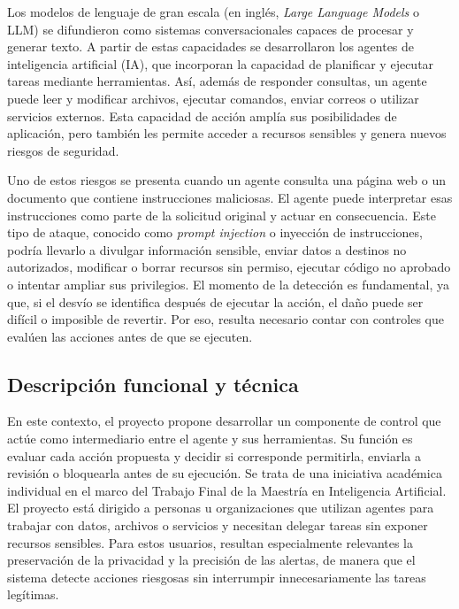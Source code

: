 \documentclass[
11pt, %
]{charter}
\begin{document}
Los modelos de lenguaje de gran escala (en inglés, \textit{Large Language Models} o LLM) se difundieron como sistemas conversacionales capaces de procesar y generar texto. A partir de estas capacidades se desarrollaron los agentes de inteligencia artificial (IA), que incorporan la capacidad de planificar y ejecutar tareas mediante herramientas. Así, además de responder consultas, un agente puede leer y modificar archivos, ejecutar comandos, enviar correos o utilizar servicios externos. Esta capacidad de acción amplía sus posibilidades de aplicación, pero también les permite acceder a recursos sensibles y genera nuevos riesgos de seguridad.

Uno de estos riesgos se presenta cuando un agente consulta una página web o un documento que contiene instrucciones maliciosas. El agente puede interpretar esas instrucciones como parte de la solicitud original y actuar en consecuencia. Este tipo de ataque, conocido como \textit{prompt injection} o inyección de instrucciones, podría llevarlo a divulgar información sensible, enviar datos a destinos no autorizados, modificar o borrar recursos sin permiso, ejecutar código no aprobado o intentar ampliar sus privilegios. El momento de la detección es fundamental, ya que, si el desvío se identifica después de ejecutar la acción, el daño puede ser difícil o imposible de revertir. Por eso, resulta necesario contar con controles que evalúen las acciones antes de que se ejecuten.

\subsection{Descripción funcional y técnica}

En este contexto, el proyecto propone desarrollar un componente de control que actúe como intermediario entre el agente y sus herramientas. Su función es evaluar cada acción propuesta y decidir si corresponde permitirla, enviarla a revisión o bloquearla antes de su ejecución. Se trata de una iniciativa académica individual en el marco del Trabajo Final de la Maestría en Inteligencia Artificial. El proyecto está dirigido a personas u organizaciones que utilizan agentes para trabajar con datos, archivos o servicios y necesitan delegar tareas sin exponer recursos sensibles. Para estos usuarios, resultan especialmente relevantes la preservación de la privacidad y la precisión de las alertas, de manera que el sistema detecte acciones riesgosas sin interrumpir innecesariamente las tareas legítimas.
\end{document}
